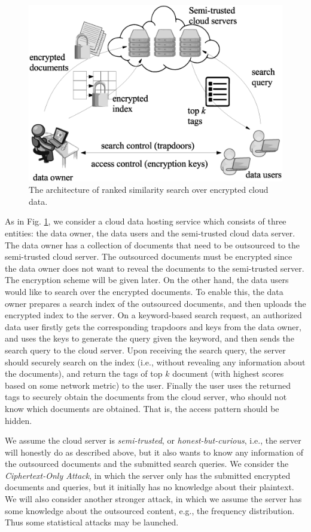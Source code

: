 \documentclass{IEEEtran}
\begin{document}
\begin{figure}
\centering
\includegraphics[width=0.8\linewidth]{system_model.eps}
\caption{The architecture of ranked similarity search over encrypted cloud data.}
\label{fig:system_model}
\end{figure}

As in Fig. \ref{fig:system_model}, we consider a cloud data hosting service which consists of three entities: the data owner, the data users and the semi-trusted cloud data server. The data owner has a collection of documents that need to be outsourced to the semi-trusted cloud server. The outsourced documents must be encrypted since the data owner does not want to reveal the documents to the semi-trusted server. The encryption scheme will be given later. On the other hand, the data users would like to search over the encrypted documents. To enable this, the data owner prepares a search index of the outsourced documents, and then uploads the encrypted index to the server. On a keyword-based search request, an authorized data user firstly gets the corresponding trapdoors and keys from the data owner, and uses the keys to generate the query given the keyword, and then sends the search query to the cloud server. Upon receiving the search query, the server should securely search on the index (i.e., without revealing any information about the documents), and return the tags of top $k$ document (with highest scores based on some network metric) to the user. Finally the user uses the returned tags to securely obtain the documents from the cloud server, who should not know which documents are obtained. That is, the access pattern should be hidden.

We assume the cloud server is \emph{semi-trusted}, or \emph{honest-but-curious}, i.e., the server will honestly do as described above, but it also wants to know any information of the outsourced documents and the submitted search queries. We consider the \emph{Ciphertext-Only Attack}, in which the server only has the submitted encrypted documents and queries, but it initially has no knowledge about their plaintext. We will also consider another stronger attack, in which we assume the server has some knowledge about the outsourced content, e.g., the frequency distribution. Thus some statistical attacks may be launched.
\end{document}
